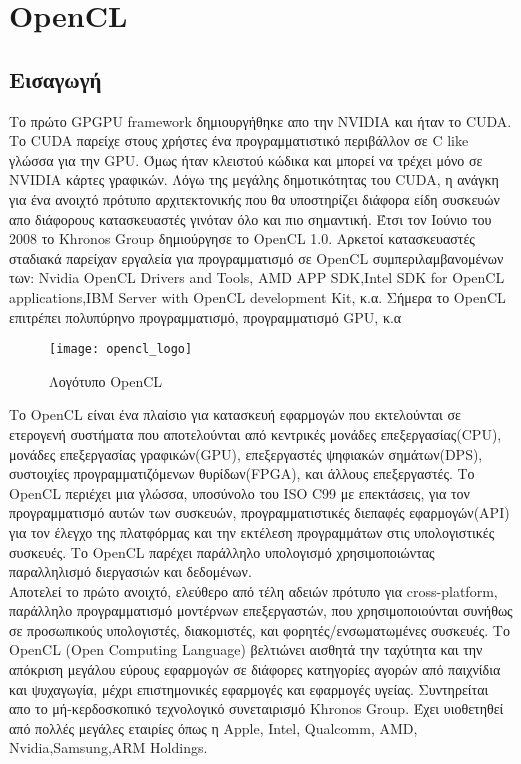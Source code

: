 \section{OpenCL}
\subsection{Εισαγωγή}
Το πρώτο GPGPU framework δημιουργήθηκε απο την NVIDIA και ήταν το CUDA. Το CUDA παρείχε στους χρήστες ένα προγραμματιστικό περιβάλλον σε C like γλώσσα για την GPU. Όμως ήταν κλειστού κώδικα και μπορεί να τρέχει μόνο σε NVIDIA κάρτες γραφικών. Λόγω της μεγάλης δημοτικότητας του CUDA, η ανάγκη για ένα ανοιχτό πρότυπο αρχιτεκτονικής που θα υποστηρίζει διάφορα είδη συσκευών απο διάφορους κατασκευαστές γινόταν όλο και πιο σημαντική. Έτσι τον Ιούνιο του 2008 το Khronos Group δημιούργησε το OpenCL 1.0. Αρκετοί κατασκευαστές σταδιακά παρείχαν εργαλεία για προγραμματισμό σε OpenCL συμπεριλαμβανομένων των: Nvidia OpenCL Drivers and Tools, AMD APP SDK,Intel SDK for OpenCL applications,IBM Server with OpenCL development Kit, κ.α. Σήμερα το OpenCL επιτρέπει πολυπύρηνο προγραμματισμό, προγραμματισμό GPU, κ.α \cite{opencl-1}   


\begin{figure}[h]
	\texttt{[image: opencl\_logo]}
	\centering
	\caption{Λογότυπο OpenCL}
\end{figure}

Το OpenCL είναι ένα πλαίσιο για κατασκευή εφαρμογών που εκτελούνται σε ετερογενή συστήματα που αποτελούνται από κεντρικές μονάδες επεξεργασίας(CPU), μονάδες επεξεργασίας γραφικών(GPU), επεξεργαστές ψηφιακών σημάτων(DPS), συστοιχίες προγραμματιζόμενων θυρίδων(FPGA), και άλλους επεξεργαστές. Το OpenCL περιέχει μια γλώσσα, υποσύνολο του ISO C99 με επεκτάσεις, για τον προγραμματισμό αυτών των συσκευών, προγραμματιστικές διεπαφές εφαρμογών(API) για τον έλεγχο της πλατφόρμας και την εκτέλεση προγραμμάτων στις υπολογιστικές συσκευές. Το OpenCL παρέχει παράλληλο υπολογισμό χρησιμοποιώντας παραλληλισμό διεργασιών και δεδομένων.\\
Αποτελεί το πρώτο ανοιχτό, ελεύθερο από τέλη αδειών πρότυπο για cross-platform, παράλληλο προγραμματισμό μοντέρνων επεξεργαστών, που χρησιμοποιούνται συνήθως σε προσωπικούς υπολογιστές, διακομιστές, και φορητές/ενσωματωμένες συσκευές. Το OpenCL (Open Computing Language) βελτιώνει αισθητά την ταχύτητα και την απόκριση μεγάλου εύρους εφαρμογών σε διάφορες κατηγορίες αγορών από παιχνίδια και ψυχαγωγία, μέχρι επιστημονικές εφαρμογές και εφαρμογές υγείας. Συντηρείται απο το μή-κερδοσκοπικό τεχνολογικό συνεταιρισμό Khronos Group. Έχει υιοθετηθεί από πολλές μεγάλες εταιρίες όπως η Apple, Intel, Qualcomm, AMD, Nvidia,Samsung,ARM Holdings.

